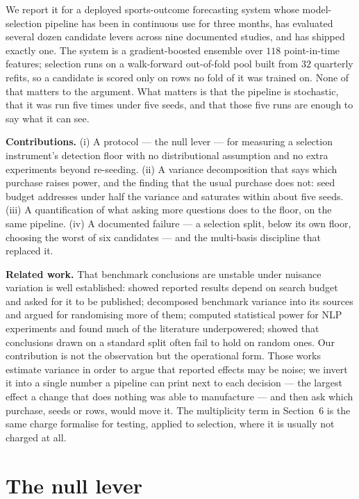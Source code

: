 \documentclass{article}
\begin{document}
We report it for a deployed sports-outcome forecasting system whose model-selection pipeline has been in continuous use for three months, has evaluated several dozen candidate levers across nine documented studies, and has shipped exactly one. The system is a gradient-boosted ensemble over $118$ point-in-time features; selection runs on a walk-forward out-of-fold pool built from $32$ quarterly refits, so a candidate is scored only on rows no fold of it was trained on. None of that matters to the argument. What matters is that the pipeline is stochastic, that it was run five times under five seeds, and that those five runs are enough to say what it can see.

\textbf{Contributions.} (i) A protocol --- the null lever --- for measuring a selection instrument's detection floor with no distributional assumption and no extra experiments beyond re-seeding. (ii) A variance decomposition that says which purchase raises power, and the finding that the usual purchase does not: seed budget addresses under half the variance and saturates within about five seeds. (iii) A quantification of what asking more questions does to the floor, on the same pipeline. (iv) A documented failure --- a selection split, below its own floor, choosing the worst of six candidates --- and the multi-basis discipline that replaced it.

\textbf{Related work.} That benchmark conclusions are unstable under nuisance variation is well established: \citet{dodge2019} showed reported results depend on search budget and asked for it to be published; \citet{bouthillier2021} decomposed benchmark variance into its sources and argued for randomising more of them; \citet{card2020} computed statistical power for NLP experiments and found much of the literature underpowered; \citet{gorman2019} showed that conclusions drawn on a standard split often fail to hold on random ones. Our contribution is not the observation but the operational form. Those works estimate variance in order to argue that reported effects may be noise; we invert it into a single number a pipeline can print next to each decision --- the largest effect a change that does nothing was able to manufacture --- and then ask which purchase, seeds or rows, would move it. The multiplicity term in Section~6 is the same charge \citet{by2001} formalise for testing, applied to selection, where it is usually not charged at all.

\section{The null lever}
\end{document}
